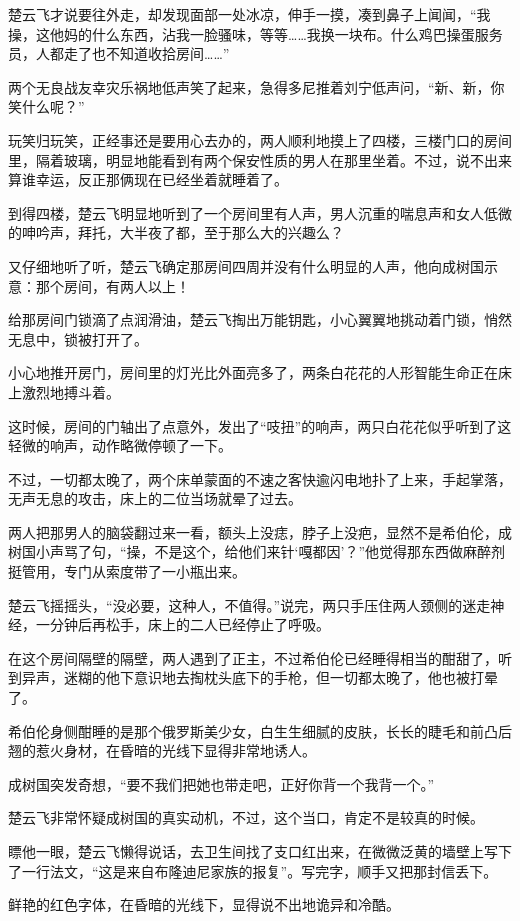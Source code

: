 楚云飞才说要往外走，却发现面部一处冰凉，伸手一摸，凑到鼻子上闻闻，“我操，这他妈的什么东西，沾我一脸骚味，等等……我换一块布。什么鸡巴操蛋服务员，人都走了也不知道收拾房间……”

两个无良战友幸灾乐祸地低声笑了起来，急得多尼推着刘宁低声问，“新、新，你笑什么呢？”

玩笑归玩笑，正经事还是要用心去办的，两人顺利地摸上了四楼，三楼门口的房间里，隔着玻璃，明显地能看到有两个保安性质的男人在那里坐着。不过，说不出来算谁幸运，反正那俩现在已经坐着就睡着了。

到得四楼，楚云飞明显地听到了一个房间里有人声，男人沉重的喘息声和女人低微的呻吟声，拜托，大半夜了都，至于那么大的兴趣么？

又仔细地听了听，楚云飞确定那房间四周并没有什么明显的人声，他向成树国示意：那个房间，有两人以上！

给那房间门锁滴了点润滑油，楚云飞掏出万能钥匙，小心翼翼地挑动着门锁，悄然无息中，锁被打开了。

小心地推开房门，房间里的灯光比外面亮多了，两条白花花的人形智能生命正在床上激烈地搏斗着。

这时候，房间的门轴出了点意外，发出了“吱扭”的响声，两只白花花似乎听到了这轻微的响声，动作略微停顿了一下。

不过，一切都太晚了，两个床单蒙面的不速之客快逾闪电地扑了上来，手起掌落，无声无息的攻击，床上的二位当场就晕了过去。

两人把那男人的脑袋翻过来一看，额头上没痣，脖子上没疤，显然不是希伯伦，成树国小声骂了句，“操，不是这个，给他们来针‘嘎都因’？”他觉得那东西做麻醉剂挺管用，专门从索度带了一小瓶出来。

楚云飞摇摇头，“没必要，这种人，不值得。”说完，两只手压住两人颈侧的迷走神经，一分钟后再松手，床上的二人已经停止了呼吸。

在这个房间隔壁的隔壁，两人遇到了正主，不过希伯伦已经睡得相当的酣甜了，听到异声，迷糊的他下意识地去掏枕头底下的手枪，但一切都太晚了，他也被打晕了。

希伯伦身侧酣睡的是那个俄罗斯美少女，白生生细腻的皮肤，长长的睫毛和前凸后翘的惹火身材，在昏暗的光线下显得非常地诱人。

成树国突发奇想，“要不我们把她也带走吧，正好你背一个我背一个。”

楚云飞非常怀疑成树国的真实动机，不过，这个当口，肯定不是较真的时候。

瞟他一眼，楚云飞懒得说话，去卫生间找了支口红出来，在微微泛黄的墙壁上写下了一行法文，“这是来自布隆迪尼家族的报复”。写完字，顺手又把那封信丢下。

鲜艳的红色字体，在昏暗的光线下，显得说不出地诡异和冷酷。


